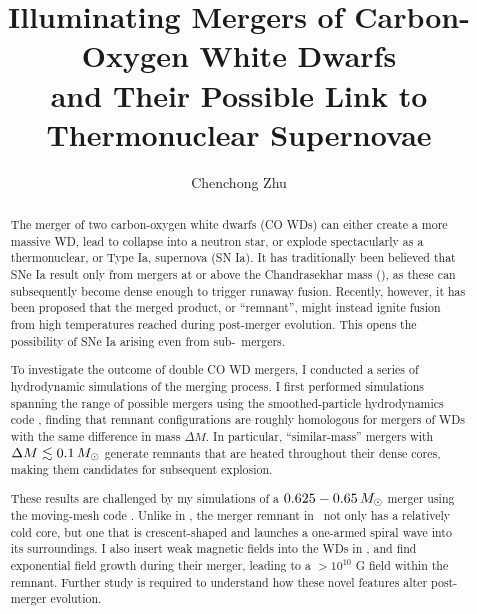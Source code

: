 \documentclass{ut-thesis}
\author{Chenchong Zhu}
\title{Illuminating Mergers of Carbon-Oxygen White Dwarfs \\
and Their Possible Link to Thermonuclear Supernovae}
\begin{document}
\begin{preliminary}

\maketitle


\begin{abstract}

The merger of two carbon-oxygen white dwarfs (CO WDs) can either create a more massive WD, lead to collapse into a neutron star, or explode spectacularly as a thermonuclear, or Type Ia, supernova (SN Ia).  It has traditionally been believed that SNe Ia result only from mergers at or above the Chandrasekhar mass (\Mch), as these can subsequently become dense enough to trigger runaway fusion.  Recently, however, it has been proposed that the merged product, or ``remnant'', might instead ignite fusion from high temperatures reached during post-merger evolution.  This opens the possibility of SNe Ia arising even from sub-\Mch\ mergers.  

To investigate the outcome of double CO WD mergers, I conducted a series of hydrodynamic simulations of the merging process.  I first performed simulations spanning the range of possible mergers using the smoothed-particle hydrodynamics code \gasoline, finding that remnant configurations are roughly homologous for mergers of WDs with the same difference in mass $\Delta M$.  In particular, ``similar-mass'' mergers with $\Delta M \lesssim 0.1\,\Msun$ generate remnants that are heated throughout their dense cores, making them candidates for subsequent explosion.

These results are challenged by my simulations of a $0.625 - 0.65\,\Msun$ merger using the moving-mesh code \arepo.  Unlike in \gasoline, the merger remnant in \arepo\ not only has a relatively cold core, but one that is crescent-shaped and launches a one-armed spiral wave into its surroundings.  I also insert weak magnetic fields into the WDs in \arepo, and find exponential field growth during their merger, leading to a $>10^{10}$ G field within the remnant.  Further study is required to understand how these novel features alter post-merger evolution.


\end{abstract}
\end{preliminary}
\end{document}
